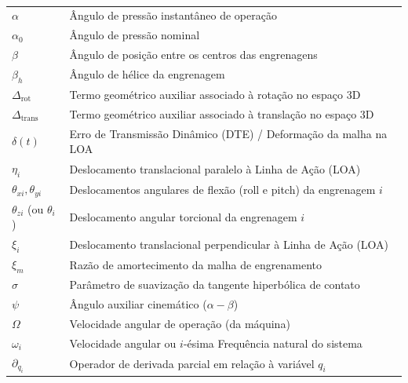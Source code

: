  \\
\begingroup
\begin{longtable}{p{} p{}}
	$ \alpha $ & Ângulo de pressão instantâneo de operação \\
	$ \alpha_0 $ & Ângulo de pressão nominal \\
	$ \beta $ & Ângulo de posição entre os centros das engrenagens \\
	$ \beta_h $ & Ângulo de hélice da engrenagem \\
	$ \Delta_{\text{rot}} $ & Termo geométrico auxiliar associado à rotação no espaço 3D \\
	$ \Delta_{\text{trans}} $ & Termo geométrico auxiliar associado à translação no espaço 3D \\
	$ \delta(t) $ & Erro de Transmissão Dinâmico (DTE) / Deformação da malha na LOA \\
	$ \eta_i $ & Deslocamento translacional paralelo à Linha de Ação (LOA) \\
	$ \theta_{xi}, \theta_{yi} $ & Deslocamentos angulares de flexão (roll e pitch) da engrenagem $i$ \\
	$ \theta_{zi} $ (ou $ \theta_i $) & Deslocamento angular torcional da engrenagem $i$ \\
	$ \xi_i $ & Deslocamento translacional perpendicular à Linha de Ação (LOA) \\
	$ \xi_m $ & Razão de amortecimento da malha de engrenamento \\
	$ \sigma $ & Parâmetro de suavização da tangente hiperbólica de contato \\
	$ \psi $ & Ângulo auxiliar cinemático ($\alpha - \beta$) \\
	$ \Omega $ & Velocidade angular de operação (da máquina) \\
	$ \omega_i $ & Velocidade angular ou $i$-ésima Frequência natural do sistema \\
	$ \partial_{q_i} $ & Operador de derivada parcial em relação à variável $q_i$ \\
\end{longtable}
\endgroup

\vspace{\baselineskip}
\newpage

